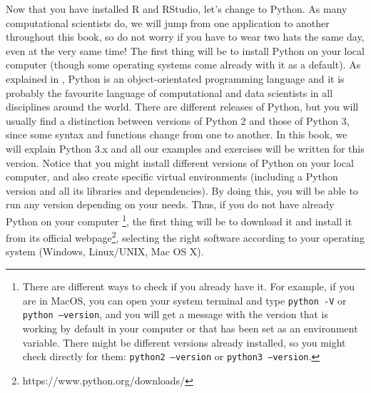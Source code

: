 Now that you have installed R and RStudio, let's change to Python. As
many computational scientists do, we will jump from one application to
another throughout this book, so do not worry if you have to wear two
hats the same day, even at the very same time! The first thing will be
to install Python on your local computer (though some operating
systems come already with it as a default). As explained in , Python is an object-orientated programming language
and it is probably the favourite language of computational and data
scientists in all disciplines around the world. There are different
releases of Python, but you will usually find a distinction between
versions of Python 2 and those of Python 3, since some syntax and
functions change from one to another. In this book, we will explain
Python 3.x and all our examples and exercises will be written for this
version. Notice that you might install different versions of Python on
your local computer, and also create specific virtual environments
(including a Python version and all its libraries and dependencies).
By doing this, you will be able to run any version depending on your
needs. Thus, if you do not have already Python on your
computer \footnote{There are different ways to check if you already
  have it. For example, if you are in MacOS, you can open your system
  terminal and type \texttt{python -V} or \texttt{python --version}, and
  you will get a message with the version that is working by default
  in your computer or that has been set as an environment
  variable. There might be different versions already installed, so
  you might check directly for them: \texttt{python2 --version} or
  \texttt{python3 --version}.}, the first thing will be to download it
and install it from its official
webpage\footnote{https://www.python.org/downloads/}, selecting the
right software according to your operating system (Windows,
Linux/UNIX, Mac OS X).



